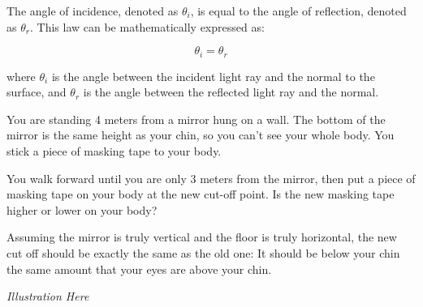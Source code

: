 \begin{mdframed}[style=important, frametitle={Law of Reflection}]
The angle of incidence, denoted as $\theta_i$, is equal to
the angle of reflection, denoted as $\theta_r$. This law can be
mathematically expressed as:

$$\theta_i = \theta_r$$
 
where $\theta_i$ is the angle between the incident light ray and the
normal to the surface, and $\theta_r$ is the angle between the
reflected light ray and the normal.



\end{mdframed}

\begin{Exercise}[title={Law of Reflection}, label=law_of_reflection]

  You are standing 4 meters from a mirror hung on a wall. The bottom
  of the mirror is the same height as your chin, so you can't see your
  whole body. You stick a piece of masking tape to your body.

  You walk forward until you are only 3 meters from the mirror, then
  put a piece of masking tape on your body at the new cut-off point. Is the new
  masking tape higher or lower on your body?
  
\end{Exercise}
\begin{Answer}[ref=law_of_reflection]

 Assuming the mirror is truly vertical and the floor is truly
 horizontal, the new cut off should be exactly the same as the old
 one: It should be below your chin the same amount that your eyes are
 above your chin.

 \textit{Illustration Here}

\end{Answer}

